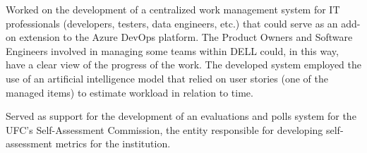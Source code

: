 \documentclass[]{rahulworld-resume}
\begin{document}
\begin{minipage}[t]{0.66\textwidth}
\begin{minipage}{0.85\textwidth\vspace{2pt}}
\end{minipage}
\sectionsep

 
\noindent
\hspace{5em}%
\begin{minipage}{0.85\textwidth\vspace{2pt}}

Worked on the development of a centralized work management system for IT professionals (developers, testers, data engineers, etc.) that could serve as an add-on extension to the Azure DevOps platform. The Product Owners and Software Engineers involved in managing some teams within DELL could, in this way, have a clear view of the progress of the work. The developed system employed the use of an artificial intelligence model that relied on user stories (one of the managed items) to estimate workload in relation to time.

\end{minipage}

\sectionsep

 
\noindent
\hspace{5em}%
\begin{minipage}{0.85\textwidth\vspace{2pt}}
Served as support for the development of an evaluations and polls system for the UFC's Self-Assessment Commission, the entity responsible for developing self-assessment metrics for the institution.

\end{minipage}

\end{minipage}


%
%
\end{document}
